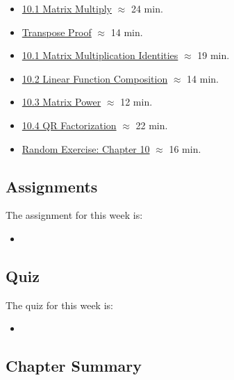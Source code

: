 \begin{itemize}
    \item \href{https://applied.cs.colorado.edu/mod/hvp/view.php?id=50788}{10.1 Matrix Multiply} $\approx$ 24 min.
    \item \href{https://applied.cs.colorado.edu/mod/hvp/view.php?id=50789}{Transpose Proof} $\approx$ 14 min.
    \item \href{https://applied.cs.colorado.edu/mod/hvp/view.php?id=50790}{10.1 Matrix Multiplication Identities} $\approx$ 19 min.
    \item \href{https://applied.cs.colorado.edu/mod/hvp/view.php?id=50791}{10.2 Linear Function Composition} $\approx$ 14 min.
    \item \href{https://applied.cs.colorado.edu/mod/hvp/view.php?id=50792}{10.3 Matrix Power} $\approx$ 12 min.
    \item \href{https://applied.cs.colorado.edu/mod/hvp/view.php?id=50793}{10.4 QR Factorization} $\approx$ 22 min.
    \item \href{https://applied.cs.colorado.edu/mod/hvp/view.php?id=50794}{Random Exercise: Chapter 10} $\approx$ 16 min.
\end{itemize}

\subsection{Assignments}

The assignment for this week is:

\begin{itemize}
    \item {}
\end{itemize}

\subsection{Quiz}

The quiz for this week is:

\begin{itemize}
    \item {}
\end{itemize}

\newpage

\subsection{Chapter Summary}

